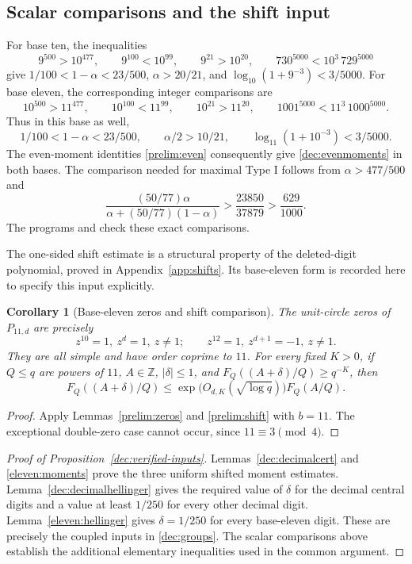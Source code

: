 \documentclass[11pt,a4paper]{article}
\theoremstyle{paperplain}
\newtheorem{corollary}[theorem]{Corollary}
\numberwithin{equation}{section}
\begin{document}
\subsection{Scalar comparisons and the shift input}

For base ten, the inequalities
\[
 9^{500}>10^{477},\qquad 9^{100}<10^{99},\qquad
 9^{21}>10^{20},\qquad 730^{5000}<10^3\,729^{5000}
\]
give $1/100<1-\alpha<23/500$, $\alpha>20/21$, and
$\log_{10}(1+9^{-3})<3/5000$.
For base eleven, the corresponding integer comparisons are
\[
 10^{500}>11^{477},\qquad 10^{100}<11^{99},\qquad
 10^{21}>11^{20},\qquad 1001^{5000}<11^3\,1000^{5000}.
\]
Thus in this base as well,
\[
 1/100<1-\alpha<23/500,\qquad \alpha/2>10/21,\qquad
 \log_{11}(1+10^{-3})<3/5000.
\]
The even-moment identities \eqref{prelim:even} consequently give
\eqref{dec:evenmoments} in both bases.
The comparison needed for maximal Type I follows from
$\alpha>477/500$ and
\[
 \frac{(50/77)\alpha}{\alpha+(50/77)(1-\alpha)}
 >\frac{23850}{37879}>\frac{629}{1000}.
\]
The programs  and
 check these exact comparisons.

The one-sided shift estimate is a structural property of the deleted-digit
polynomial, proved in Appendix~\ref{app:shifts}. Its base-eleven form is
recorded here to specify this input explicitly.

\begin{corollary}[Base-eleven zeros and shift comparison]
\label{eleven:zeros}\label{eleven:shift}
The unit-circle zeros of $P_{11,d}$ are precisely
\[
 z^{10}=1,\ z^d=1,\ z\ne1;
 \qquad
 z^{12}=1,\ z^{d+1}=-1,\ z\ne1.
\]
They are all simple and have order coprime to $11$. For every fixed $K>0$,
if $Q\leqslant q$ are powers of $11$, $A\in\mathbb Z$,
$|\delta|\leqslant1$, and $F_Q((A+\delta)/Q)\geqslant q^{-K}$, then
\begin{equation}\label{eleven:distortion}
 F_Q((A+\delta)/Q)
 \leqslant\exp\!\bigl(O_{d,K}(\sqrt{\log q})\bigr)F_Q(A/Q).
\end{equation}
\end{corollary}
\begin{proof}
Apply Lemmas~\ref{prelim:zeros} and \ref{prelim:shift} with $b=11$.
The exceptional double-zero case cannot occur, since $11\equiv3\pmod4$.
\end{proof}

\begin{proof}[Proof of Proposition~\ref{dec:verified-inputs}]
Lemmas~\ref{dec:decimalcert} and \ref{eleven:moments} prove the three
uniform shifted moment estimates. Lemma~\ref{dec:decimalhellinger}
gives the required value of $\delta$ for the decimal central digits
and a value at least $1/250$ for every other decimal digit.
Lemma~\ref{eleven:hellinger} gives $\delta=1/250$ for every base-eleven
digit. These are precisely the coupled inputs in \eqref{dec:groups}.
The scalar comparisons above establish the additional elementary
inequalities used in the common argument.
\end{proof}
\end{document}
